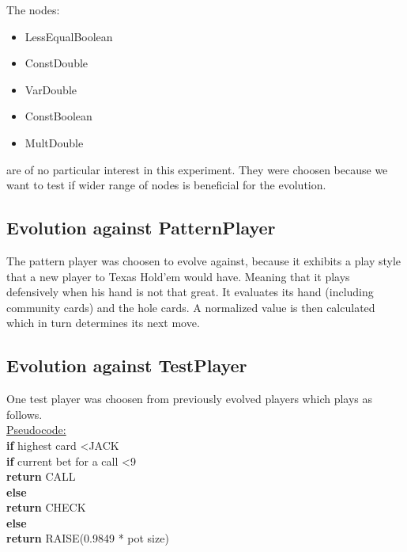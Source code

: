 \documentclass[12pt,fleqn,a4paper]{article}
\begin{document}
The nodes:
\begin{itemize}
	\item LessEqualBoolean
	\item ConstDouble
	\item VarDouble
	\item ConstBoolean
	\item MultDouble 
\end{itemize}
are of no particular interest in this experiment. They were choosen because we want to test if wider range of nodes is beneficial for the evolution.

\subsection{Evolution against PatternPlayer}
\label{ssec:patternplayer}
The pattern player was choosen to evolve against, because it exhibits a play style that a new player to Texas Hold'em would have. Meaning that it plays defensively when his hand is not that great. It evaluates its hand (including community cards) and the hole cards. A normalized value is then calculated which in turn determines its next move.

\newpage

\subsection{Evolution against TestPlayer}
\label{ssec:testplayer}
One test player was choosen from previously evolved players which plays as follows.\\

\underline{Pseudocode:}\\

\textbf{if} highest card \textless \hspace*{0.5em}JACK \\
\hspace*{3em}\textbf{if} current bet for a call \textless \hspace*{0.5em}9 \\
\hspace*{3.9em} \textbf{return} CALL \\
\hspace*{2.5em} \textbf{else} \\
\hspace*{3.9em} \textbf{return} CHECK \\
\hspace*{1.5em} \textbf{else}  \\
\hspace*{3em} \textbf{return} RAISE(0.9849 * pot size) \\
\end{document}
